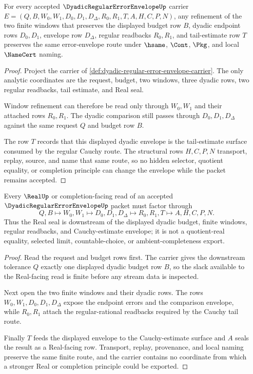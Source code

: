 \begin{theorem}
\label{thm:dyadic-regular-error-envelope-stability}
For every accepted $\DyadicRegularErrorEnvelopeUp$ carrier $E=(Q,B,W_0,W_1,D_0,D_1,D_\Delta,R_0,R_1,T,A,H,C,P,N)$, any refinement of the two finite windows that preserves the displayed budget row $B$, dyadic endpoint rows $D_0,D_1$, envelope row $D_\Delta$, regular readbacks $R_0,R_1$, and tail-estimate row $T$ preserves the same error-envelope route under $\hsame$, $\Cont$, $\Pkg$, and local $\NameCert$ naming.
\end{theorem}
\begin{proof}
Project the carrier of \autoref{def:dyadic-regular-error-envelope-carrier}. The only analytic coordinates are the request, budget, two windows, three dyadic rows, two regular readbacks, tail estimate, and Real seal.

Window refinement can therefore be read only through $W_0,W_1$ and their attached rows $R_0,R_1$. The dyadic comparison still passes through $D_0,D_1,D_\Delta$ against the same request $Q$ and budget row $B$.

The row $T$ records that this displayed dyadic envelope is the tail-estimate surface consumed by the regular Cauchy route. The structural rows $H,C,P,N$ transport, replay, source, and name that same route, so no hidden selector, quotient equality, or completion principle can change the envelope while the packet remains accepted.
\end{proof}

\begin{theorem}
\label{thm:dyadic-regular-error-envelope-real-readback}
Every $\RealUp$ or completion-facing read of an accepted $\DyadicRegularErrorEnvelopeUp$ packet must factor through
$$
Q,B \longmapsto W_0,W_1 \longmapsto D_0,D_1,D_\Delta \longmapsto R_0,R_1,T \longmapsto A,H,C,P,N .
$$
Thus the Real seal is downstream of the displayed dyadic budget, finite windows, regular readbacks, and Cauchy-estimate envelope; it is not a quotient-real equality, selected limit, countable-choice, or ambient-completeness export.
\end{theorem}
\begin{proof}
Read the request and budget rows first. The carrier gives the downstream tolerance $Q$ exactly one displayed dyadic budget row $B$, so the slack available to the Real-facing read is finite before any stream data is inspected.

Next open the two finite windows and their dyadic rows. The rows $W_0,W_1,D_0,D_1,D_\Delta$ expose the endpoint errors and the comparison envelope, while $R_0,R_1$ attach the regular-rational readbacks required by the Cauchy tail route.

Finally $T$ feeds the displayed envelope to the Cauchy-estimate surface and $A$ seals the result as a Real-facing row. Transport, replay, provenance, and local naming preserve the same finite route, and the carrier contains no coordinate from which a stronger Real or completion principle could be exported.
\end{proof}

